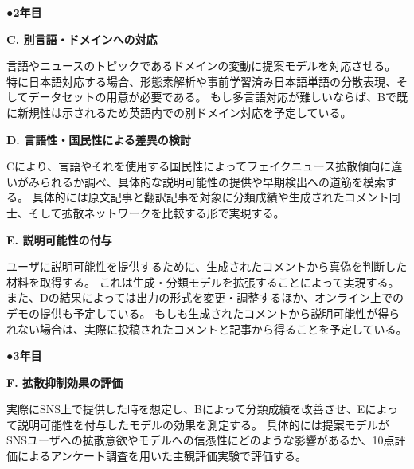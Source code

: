 {	%


	\noindent
	●\textbf{2年目}

	\noindent
	\textbf{C. 別言語・ドメインへの対応}

	言語やニュースのトピックであるドメインの変動に提案モデルを対応させる。
	特に日本語対応する場合、形態素解析や事前学習済み日本語単語の分散表現、そしてデータセットの用意が必要である。
	もし多言語対応が難しいならば、Bで既に新規性は示されるため英語内での別ドメイン対応を予定している。

	\noindent
	\textbf{D. 言語性・国民性による差異の検討}

	Cにより、言語やそれを使用する国民性によってフェイクニュース拡散傾向に違いがみられるか調べ、具体的な説明可能性の提供や早期検出への道筋を模索する。
	具体的には原文記事と翻訳記事を対象に分類成績や生成されたコメント同士、そして拡散ネットワークを比較する形で実現する。

	\noindent
	\textbf{E. 説明可能性の付与}

	ユーザに説明可能性を提供するために、生成されたコメントから真偽を判断した材料を取得する。
	これは生成・分類モデルを拡張することによって実現する。
	また、Dの結果によっては出力の形式を変更・調整するほか、オンライン上でのデモの提供も予定している。
	もしも生成されたコメントから説明可能性が得られない場合は、実際に投稿されたコメントと記事から得ることを予定している。

	\noindent
	●\textbf{3年目}

	\noindent
	\textbf{F. 拡散抑制効果の評価}

	実際にSNS上で提供した時を想定し、Bによって分類成績を改善させ、Eによって説明可能性を付与したモデルの効果を測定する。
	具体的には提案モデルがSNSユーザへの拡散意欲やモデルへの信憑性にどのような影響があるか、10点評価によるアンケート調査を用いた主観評価実験で評価する。

}

